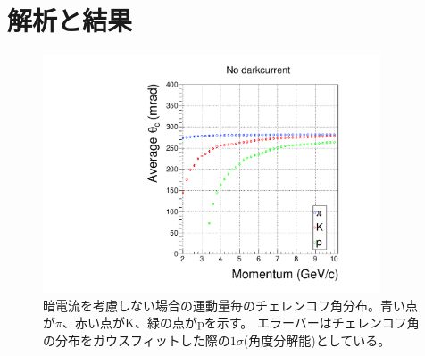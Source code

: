 \section{解析と結果}


\begin{figure}
  \centering
  \includegraphics[width=10cm,page=1]{images/chapter4/angleAndMultiGraph.pdf}
  \caption{
    暗電流を考慮しない場合の運動量毎のチェレンコフ角分布。青い点が$\pi$、赤い点がK、緑の点がpを示す。
    エラーバーはチェレンコフ角の分布をガウスフィットした際の$1\sigma$(角度分解能)としている。
  }
  \label{fig:angleMultiGraph1}
\end{figure}
